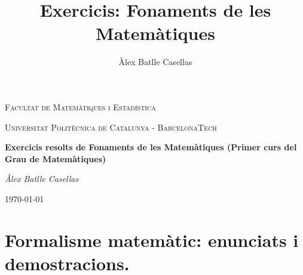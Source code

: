 \documentclass[11pt]{article}
\title{Exercicis: Fonaments de les Matemàtiques}
\author{Àlex Batlle Casellas}
\begin{document}
\begin{titlepage}
	\centering
	{\scshape\LARGE Facultat de Matemàtiques i Estadística \par}
	\vspace{1cm}
	{\scshape\Large Universitat Politècnica de Catalunya - BarcelonaTech\par}
	\vspace{1.5cm}
	{\huge\bfseries Exercicis resolts de Fonaments de les Matemàtiques (Primer curs del Grau de Matemàtiques)
	\par}
	\vspace{2cm}
	{\Large\itshape Àlex Batlle Casellas\par}

	\vfill

	{\large \today\par}
\end{titlepage}


\vfill
\newpage

\tableofcontents
\newpage
\section{Formalisme matemàtic: enunciats i demostracions.}

\newpage
\end{document}
